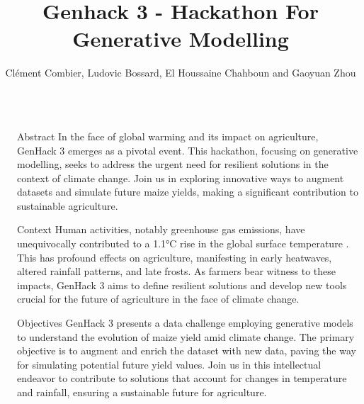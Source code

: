 \documentclass[final]{beamer}
\title{Genhack 3 - Hackathon For Generative Modelling}
\author{Clément Combier, Ludovic Bossard, El Houssaine Chahboun and Gaoyuan Zhou}
\institute[shortinst]{Deneter's Vision, École Polytechnique and PNB Paribas}
\newlength{\sepwidth}
\newlength{\colwidth}
\newcommand{\separatorcolumn}{\begin{column}{\sepwidth}\end{column}}
\begin{document}
\begin{frame}[t]
\begin{columns}[t]
\separatorcolumn

\begin{column}{\colwidth}
    \begin{block}{Abstract}
        In the face of global warming and its impact on agriculture, GenHack 3 emerges as a pivotal event. This hackathon, focusing on generative modelling, seeks to address the urgent need for resilient solutions in the context of climate change. Join us in exploring innovative ways to augment datasets and simulate future maize yields, making a significant contribution to sustainable agriculture.
    \end{block}

    \begin{block}{Context}
        Human activities, notably greenhouse gas emissions, have unequivocally contributed to a 1.1°C rise in the global surface temperature \cite{Calvin2023}. This has profound effects on agriculture, manifesting in early heatwaves, altered rainfall patterns, and late frosts. As farmers bear witness to these impacts, GenHack 3 aims to define resilient solutions and develop new tools crucial for the future of agriculture in the face of climate change. 
    \end{block}

    \begin{block}{Objectives}
        GenHack 3 presents a data challenge employing generative models to understand the evolution of maize yield amid climate change. The primary objective is to augment and enrich the dataset with new data, paving the way for simulating potential future yield values. Join us in this intellectual endeavor to contribute to solutions that account for changes in temperature and rainfall, ensuring a sustainable future for agriculture.
    \end{block}


\end{column}
\end{columns}
\end{frame}
\end{document}
